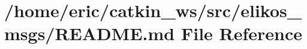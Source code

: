 \hypertarget{elikos__msgs_2README_8md}{}\section{/home/eric/catkin\+\_\+ws/src/elikos\+\_\+msgs/\+R\+E\+A\+D\+ME.md File Reference}
\label{elikos__msgs_2README_8md}
